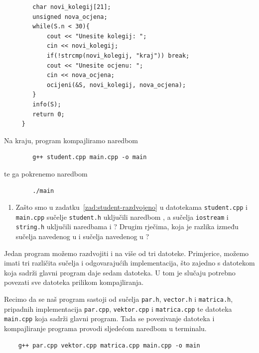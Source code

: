\begin{rjesenje}
\begin{verbatim}
        char novi_kolegij[21];
        unsigned nova_ocjena;
        while(S.n < 30){
            cout << "Unesite kolegij: ";
            cin << novi_kolegij;
            if(!strcmp(novi_kolegij, "kraj")) break;
            cout << "Unesite ocjenu: ";
            cin << nova_ocjena;
            ocijeni(&S, novi_kolegij, nova_ocjena); 
        }
        info(S);
        return 0;
     }
    \end{verbatim}
    Na kraju, program kompajliramo naredbom
    \begin{verbatim}
        g++ student.cpp main.cpp -o main
    \end{verbatim}
    te ga pokrenemo naredbom
    \begin{verbatim}
        ./main
    \end{verbatim}
\end{rjesenje}

\begin{razmisljanje}
    \begin{enumerate}
        \item Zašto smo u zadatku~\ref{zad:student-razdvojeno} u datotekama \texttt{student.cpp} i \texttt{main.cpp} sučelje \texttt{student.h} uključili naredbom ,
        a sučelja \texttt{iostream} i \texttt{string.h} uključili naredbama  i ? Drugim rječima, koja je razlika između sučelja navedenog u  i sučelja navedenog u \markdown{<>}? 
    \end{enumerate}
\end{razmisljanje}

Jedan program možemo razdvojiti i na više od tri datoteke. Primjerice, možemo imati tri različita sučelja i odgovarajućih implementacija, što zajedno s datotekom koja sadrži glavni program daje sedam datoteka. U tom je slučaju potrebno povezati sve datoteka prilikom kompajliranja.

Recimo da se naš program sastoji od sučelja \texttt{par.h}, \texttt{vector.h} i \texttt{matrica.h}, pripadnih implementacija \texttt{par.cpp}, \texttt{vektor.cpp} i \texttt{matrica.cpp} te datoteka \texttt{main.cpp} koja sadrži glavni program. Tada se povezivanje datoteka i kompajliranje programa provodi sljedećom naredbom u terminalu.

\begin{verbatim}
    g++ par.cpp vektor.cpp matrica.cpp main.cpp -o main
\end{verbatim}

